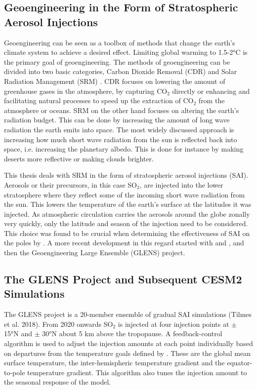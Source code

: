 \subsection{Geoengineering in the Form of Stratospheric Aerosol Injections}
Geoengineering can be seen as a toolbox of methods that change the earth's climate system to achieve a desired effect. Limiting global warming to 1.5-2°C is the primary goal of geoengineering. The methods of geoengineering can be divided into two basic categories, Carbon Dioxide Removal (CDR) and Solar Radiation Management (SRM) \parencite{shepherd2009}. CDR focuses on lowering the amount of greenhouse gases in the atmosphere, by capturing CO$_2$ directly or enhancing and facilitating natural processes to speed up the extraction of CO$_2$ from the atmosphere or oceans. SRM on the other hand focuses on altering the earth's radiation budget. This can be done by increasing the amount of long wave radiation the earth emits into space. The most widely discussed approach is increasing how much short wave radiation from the sun is reflected back into space, i.e. increasing the planetary albedo. This is done for instance by making deserts more reflective or making clouds brighter. 

This thesis deals with SRM in the form of stratospheric aerosol injections (SAI). Aerosols or their precursors, in this case SO$_2$, are injected into the lower stratosphere where they reflect some of the incoming short wave radiation from the sun. This lowers the temperature of the earth's surface at the latitudes it was injected. As atmospheric circulation carries the aerosols around the globe zonally very quickly, only the latitude and season of the injection need to be considered. This choice was found to be crucial when determining the effectiveness of SAI on the poles by \textcite{duffey2023}. A more recent development in this regard started with \textcite{kravitz2017} and \textcite{macmartin2017}, and then the Geoengineering Large Ensemble (GLENS) project. 

\subsection{The GLENS Project and Subsequent CESM2 Simulations}
The GLENS project is a 20-member ensemble of gradual SAI simulations (Tilmes et al. 2018). From 2020 onwards SO$_2$ is injected at four injection points at $\pm$ 15°N and $\pm$ 30°N about 5 km above the tropopause. A feedback-control algorithm is used to adjust the injection amounts at each point individually based on departures from the temperature goals defined by \textcite{kravitz2016}. These are the global mean surface temperature, the inter-hemispheric temperature gradient and the equator-to-pole temperature gradient. This algorithm also tunes the injection amount to the seasonal response of the model. 

